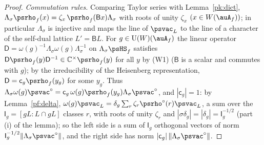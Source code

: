 \documentclass[10pt]{amsart}
\theoremstyle{definition}
\theoremstyle{remark}
\newcommand{\C}{\mathbb C}
\providecommand{\auU}{\mathrm U}
\begin{document}
\begin{proof}
\emph{Commutation rules.} Comparing Taylor series with Lemma~\ref{pk:dict},
$\Lambda_\sigma\psrho_f(x)=\zeta_x\,\psrho_f(\mathsf Bx)\Lambda_\sigma$ with roots of unity
$\zeta_x$ $(x\in W(\auA_f))$; in particular $\Lambda_\sigma$ is injective and maps the line of
$\psvac_L$ to the line of a character of the self-dual lattice $L'=\mathsf BL$. For
$g\in\auU(W)(\auA_f)$ the linear operator $\mathsf D=\omega(g)^{-1}\Lambda_\sigma\omega(g)
\Lambda_\sigma^{-1}$ on $\Lambda_\sigma\psHS_f$ satisfies $\mathsf D\psrho_f(y)\mathsf D^{-1}\in
\C^\times\psrho_f(y)$ for all $y$ by (W1) ($\mathsf B$ is a scalar and commutes with $g$); by the
irreducibility of the Heisenberg representation, $\mathsf D=\mathsf c_g\psrho_f(y_g)$ for some
$y_g$. Thus $\Lambda_\sigma\omega(g)\psvac^\circ=\mathsf c_g\,\omega(g)\psrho_f(y_g)\Lambda_\sigma
\psvac^\circ$, and $|\mathsf c_g|=1$: by Lemma~\ref{pf:delta}, $\omega(g)\psvac_L=\delta_g\sum_r\zeta_r\psrho^\circ(r)
\psvac_L$, a sum over the $\mathsf I_g=[gL:L\cap gL]$ classes $r$, with roots of unity $\zeta_r$ and
$|\sigma\delta_g|=|\delta_g|=\mathsf I_g^{-1/2}$ (part (i) of the lemma); so the left
side is a sum of $\mathsf I_g$ orthogonal vectors of norm $\mathsf I_g^{-1/2}\|\Lambda_\sigma
\psvac^\circ\|$, and the right side has norm $|\mathsf c_g|\,\|\Lambda_\sigma\psvac^\circ\|$.


\end{proof}
\end{document}
